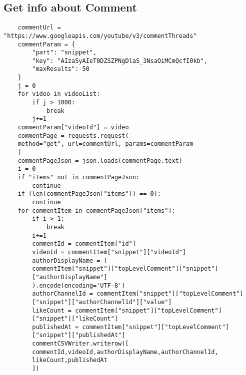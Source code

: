 \documentclass[10pt]{article}
\begin{document}
	\subsection{Get info about Comment}
	\begin{lstlisting}
	commentUrl = "https://www.googleapis.com/youtube/v3/commentThreads"
	commentParam = {
		"part": "snippet",
		"key": "AIzaSyAIeT0DZSZPNgDlaS_3NsaOiMCmQcfI0kb",
		"maxResults": 50
	}
	j = 0
	for video in videoList:
		if j > 1000:
			break
		j+=1
	commentParam["videoId"] = video
	commentPage = requests.request(
	method="get", url=commentUrl, params=commentParam
	)
	commentPageJson = json.loads(commentPage.text)
	i = 0
	if "items" not in commentPageJson:
		continue
	if (len(commentPageJson["items"]) == 0):
		continue
	for commentItem in commentPageJson["items"]:
		if i > 1:
			break
		i+=1
		commentId = commentItem["id"]
		videoId = commentItem["snippet"]["videoId"]
		authorDisplayName = (
		commentItem["snippet"]["topLevelComment"]["snippet"]
		["authorDisplayName"]
		).encode(encoding='UTF-8')
		authorChannelId = commentItem["snippet"]["topLevelComment"]
		["snippet"]["authorChannelId"]["value"]
		likeCount = commentItem["snippet"]["topLevelComment"]
		["snippet"]["likeCount"]
		publishedAt = commentItem["snippet"]["topLevelComment"]
		["snippet"]["publishedAt"]
		commentCSVWriter.writerow([
		commentId,videoId,authorDisplayName,authorChannelId,
		likeCount,publishedAt
		])
	\end{lstlisting}
\end{document}
